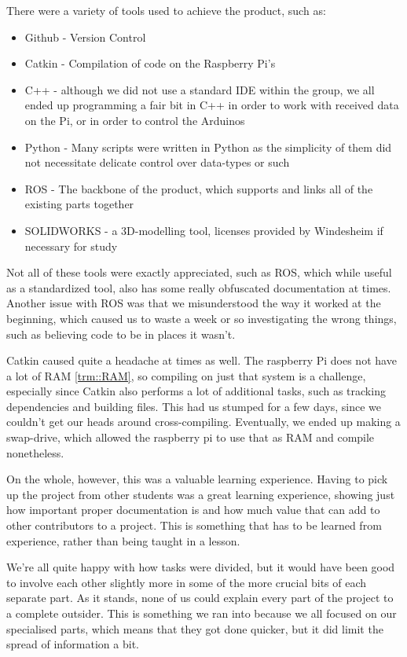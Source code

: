 There were a variety of tools used to achieve the product, such as:
\begin{itemize}
\item Github - Version Control
\item Catkin - Compilation of code on the Raspberry Pi's
\item C++ - although we did not use a standard IDE within the group, we all ended up programming a fair bit in C++ in order to work with received data on the Pi, or in order to control the Arduinos
\item Python - Many scripts were written in Python as the simplicity of them did not necessitate delicate control over data-types or such
\item ROS - The backbone of the product, which supports and links all of the existing parts together
\item SOLIDWORKS - a 3D-modelling tool, licenses provided by Windesheim if necessary for study
\end{itemize}
Not all of these tools were exactly appreciated, such as ROS, which while useful as a standardized tool, also has some really obfuscated documentation at times.
Another issue with ROS was that we misunderstood the way it worked at the beginning, which caused us to waste a week or so investigating the wrong things, such as believing code to be in places it wasn't.

Catkin caused quite a headache at times as well.
The raspberry Pi does not have a lot of RAM \ref{trm::RAM}, so compiling on just that system is a challenge, especially since Catkin also performs a lot of additional tasks, such as tracking dependencies and building files.
This had us stumped for a few days, since we couldn't get our heads around cross-compiling.
Eventually, we ended up making a swap-drive, which allowed the raspberry pi to use that as RAM and compile nonetheless.

On the whole, however, this was a valuable learning experience.
Having to pick up the project from other students was a great learning experience, showing just how important proper documentation is and how much value that can add to other contributors to a project.
This is something that has to be learned from experience, rather than being taught in a lesson.

We're all quite happy with how tasks were divided, but it would have been good to involve each other slightly more in some of the more crucial bits of each separate part.
As it stands, none of us could explain every part of the project to a complete outsider.
This is something we ran into because we all focused on our specialised parts, which means that they got done quicker, but it did limit the spread of information a bit.

\newpage
